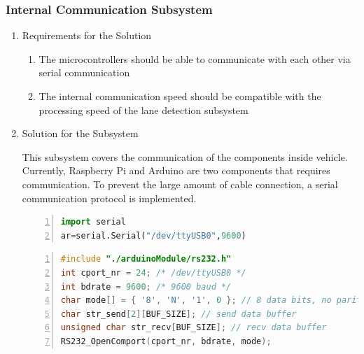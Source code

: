 \documentclass[a4paper,12pt]{article}
\begin{document}
			
		\subsubsection{Internal Communication Subsystem}
		
			\begin{enumerate}
				\item {Requirements for the Solution}
				
				\begin{enumerate}
					\item The microcontrollers should be able to communicate with each other via serial communication
					\item The internal communication speed should be compatible with the processing speed of the lane detection subsystem  
				\end{enumerate}
			
				\item {Solution for the Subsystem}
				
				This subsystem covers the communication of the components inside vehicle. Currently, Raspberry Pi and Arduino are two components that requires communication. To prevent the large amount of cable connection, a serial communication protocol is implemented. 
		\begin{lstlisting}[language=Python,float=h!,numbers=left,frame=single,caption=Serial object decleration in Python,label=sc:serial_python, captionpos=b ] 
import serial
ar=serial.Serial("/dev/ttyUSB0",9600)
		\end{lstlisting}
		 \begin{lstlisting}[language=C,float=h!,numbers=left,frame=single,caption=Serial communication setup in C,label=sc:serial_c, captionpos=b ] 
#include "./arduinoModule/rs232.h"
int cport_nr = 24; /* /dev/ttyUSB0 */
int bdrate = 9600; /* 9600 baud */
char mode[] = { '8', 'N', '1', 0 }; // 8 data bits, no parity, 1 stop bit
char str_send[2][BUF_SIZE]; // send data buffer
unsigned char str_recv[BUF_SIZE]; // recv data buffer
RS232_OpenComport(cport_nr, bdrate, mode);
		\end{lstlisting}
	

\end{enumerate}
\end{document}
